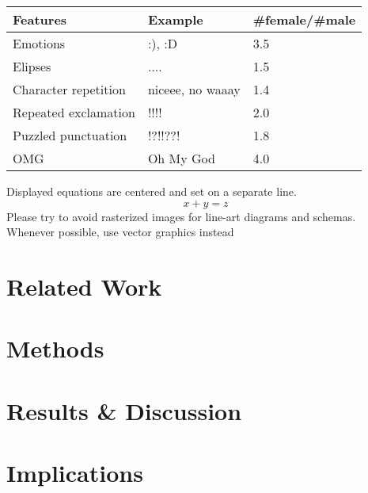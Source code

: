 \documentclass[runningheads]{llncs}
\begin{document}
	\begin{table}
		\begin{tabular}{|l|l|l|}
			\hline
			 Features &  Example & \#female/\#male\\
			\hline
			Emotions &  :), :D & 3.5\\
			Elipses &  ....  & 1.5\\
			Character repetition & niceee, no waaay & 1.4\\
			Repeated exclamation & !!!!  &  2.0 \\
			Puzzled punctuation & !?!!??! & 1.8\\
			OMG & Oh My God & 4.0\\
			\hline
		\end{tabular}
	\end{table}
	
	\noindent Displayed equations are centered and set on a separate
	line.
	\begin{equation}
	x + y = z
	\end{equation}
	Please try to avoid rasterized images for line-art diagrams and
	schemas. Whenever possible, use vector graphics instead 

	\section{Related Work}
	
	\section{Methods}
	
	\section{Results \& Discussion}
	
	\section{Implications}
	
	
	\nocite{*}
	
	
	
\end{document}

